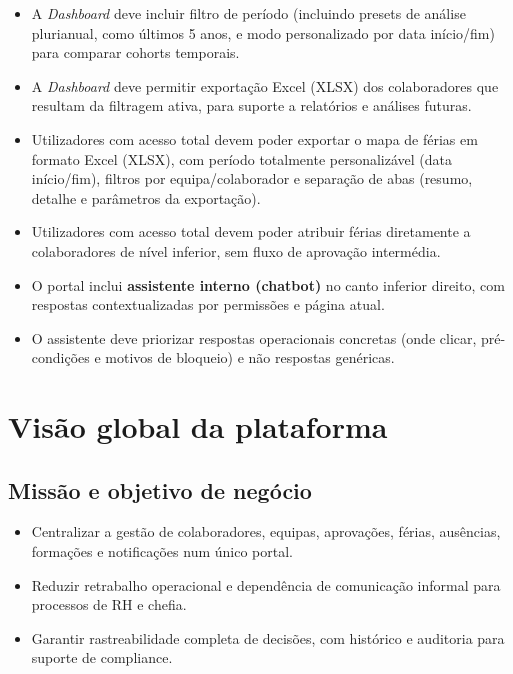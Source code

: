 \documentclass[11pt,a4paper]{article}
\begin{document}
\begin{itemize}
  \item A \textit{Dashboard} deve incluir filtro de período (incluindo presets de análise plurianual, como últimos 5 anos, e modo personalizado por data início/fim) para comparar cohorts temporais.
  \item A \textit{Dashboard} deve permitir exportação Excel (XLSX) dos colaboradores que resultam da filtragem ativa, para suporte a relatórios e análises futuras.
  \item Utilizadores com acesso total devem poder exportar o mapa de férias em formato Excel (XLSX), com período totalmente personalizável (data início/fim), filtros por equipa/colaborador e separação de abas (resumo, detalhe e parâmetros da exportação).
  \item Utilizadores com acesso total devem poder atribuir férias diretamente a colaboradores de nível inferior, sem fluxo de aprovação intermédia.
  \item O portal inclui \textbf{assistente interno (chatbot)} no canto inferior direito, com respostas contextualizadas por permissões e página atual.
  \item O assistente deve priorizar respostas operacionais concretas (onde clicar, pré-condições e motivos de bloqueio) e não respostas genéricas.
\end{itemize}

\section{Visão global da plataforma}
\subsection{Missão e objetivo de negócio}
\begin{itemize}
  \item Centralizar a gestão de colaboradores, equipas, aprovações, férias, ausências, formações e notificações num único portal.
  \item Reduzir retrabalho operacional e dependência de comunicação informal para processos de RH e chefia.
  \item Garantir rastreabilidade completa de decisões, com histórico e auditoria para suporte de compliance.
\end{itemize}
\end{document}

